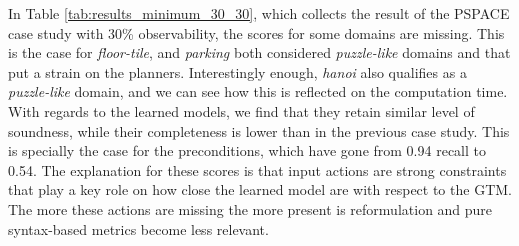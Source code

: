 In Table \ref{tab:results_minimum_30_30}, which collects the result of the PSPACE case study with 30\% observability, the scores for some domains are missing. This is the case for {\em floor-tile}, and {\em parking} both considered \emph{puzzle-like} domains and that put a strain on the planners. Interestingly enough, {\em hanoi} also qualifies as a \emph{puzzle-like} domain, and we can see how this is reflected on the computation time. With regards to the learned models, we find that they retain similar level of soundness, while their completeness is lower than in the previous case study. This is specially the case for the preconditions, which have gone from 0.94 recall to 0.54. %
The explanation for these scores is that input actions are strong constraints that play a key role on how close the learned model are with respect to the GTM. The more these actions are missing the more present is reformulation and pure syntax-based metrics become less relevant.

